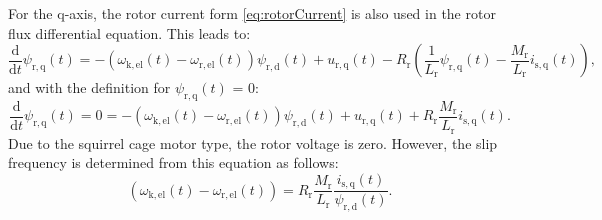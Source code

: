 \begin{solutionblock}
    For the q-axis, the rotor current form \eqref{eq:rotorCurrent} is also used in the rotor flux differential equation. This leads to:
    \begin{equation}
        \frac{\mathrm{d}}{\mathrm{d}t} \psi_{\mathrm{r,q}}(t) = -(\omega_{\mathrm{k,el}}(t)-\omega_{\mathrm{r,el}}(t))\psi_{\mathrm{r,d}}(t) + u_{\mathrm{r,q}}(t) - R_{\mathrm{r}} \left(\frac{1}{L_{\mathrm{r}}} \psi_{\mathrm{r,q}}(t) - \frac{M_{\mathrm{r}}}{L_{\mathrm{r}}}i_{\mathrm{s,q}}(t) \right),
    \end{equation}
    and with the definition for $\psi_{\mathrm{r,q}}(t)$ = 0:
    \begin{equation}
        \frac{\mathrm{d}}{\mathrm{d}t} \psi_{\mathrm{r,q}}(t) = 0 = -(\omega_{\mathrm{k,el}}(t)-\omega_{\mathrm{r,el}}(t))\psi_{\mathrm{r,d}}(t) + u_{\mathrm{r,q}}(t) + R_{\mathrm{r}} \frac{M_{\mathrm{r}}}{L_{\mathrm{r}}}i_{\mathrm{s,q}}(t).
    \end{equation}
    Due to the squirrel cage motor type, the rotor voltage is zero. However, the slip frequency is determined from this equation as follows:
    \begin{equation}
        (\omega_{\mathrm{k,el}}(t)-\omega_{\mathrm{r,el}}(t))
        = R_{\mathrm{r}} \frac{M_{\mathrm{r}}}{L_{\mathrm{r}}} \frac{i_{\mathrm{s,q}}(t)}{\psi_{\mathrm{r,d}}(t)}.
    \end{equation}


\end{solutionblock}
